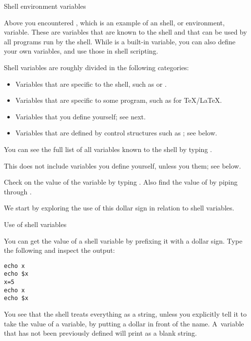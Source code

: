 
 {Shell environment variables}
\label{tut:shellvars}

Above you encountered , which is an example of an
shell, or environment, variable. These are variables that are known to the shell
and that can be used by all programs run by the shell.
While  is a built-in variable, you can also define your own
variables, and use those in shell scripting.

Shell variables are roughly divided in the following categories:
\begin{itemize}
\item Variables that are specific to the shell, such as  or .
\item Variables that are specific to some program, such as  for \TeX/\LaTeX.
\item Variables that you define yourself; see next.
\item Variables that are defined by control structures such as ;
  see below.
\end{itemize}

You can see the
full list of all variables known to the shell by typing .
\begin{remark}
  This does not include variables you define yourself, unless you  them;
  see below.
\end{remark}

\begin{exercise}
  Check on the value of the  variable by typing
    . Also find the value of  by piping 
    through .
\end{exercise}

We start by exploring the use of this dollar sign in relation to shell variables.

 {Use of shell variables}

You can get the value of a shell variable by prefixing it with
a dollar sign.
Type the following and inspect the output:
\begin{verbatim}
echo x
echo $x
x=5
echo x
echo $x
\end{verbatim}

You see that the shell treats everything as a string, unless you explicitly tell it
to take the value of a variable, by putting a dollar in front of the name.
A~variable that has not been previously defined will print as a blank string.

